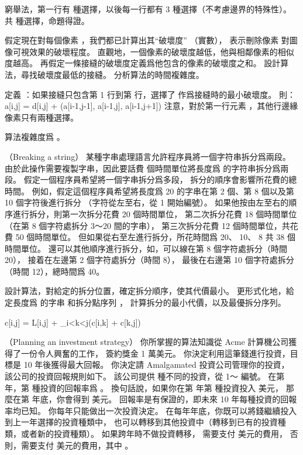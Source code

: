 \startANSWER
窮舉法，第一行有  種選擇，以後每一行都有 3 種選擇（不考慮邊界的特殊性）。
共  種選擇，命題得證。
\stopANSWER

\startigNum[continue]
\startitem
假定現在對每個像素 ，我們都已計算出其“破壞度”  （實數），
表示刪除像素  對圖像可視效果的破壞程度。
直觀地，一個像素的破壞度越低，他與相鄰像素的相似度越高。
再假定一條接縫的破壞度定義爲他包含的像素的破壞度之和。
設計算法，尋找破壞度最低的接縫。
分析算法的時間複雜度。
\stopitem
\stopigNum

\startANSWER
定義 ：如果接縫只包含第 1 行到第  行，選擇了  作爲接縫時的最小破壞度。
則：
\startformula
a[i,j] = d[i,j] + \min(a[i-1,j-1], a[i-1,j], a[i-1,j+1])
\stopformula
注意，對於第一行元素 ，其他行邊緣像素只有兩種選擇。

算法複雜度爲 。
\stopANSWER

\stopPROBLEM

\startPROBLEM
（Breaking a string）
某種字串處理語言允許程序員將一個字符串拆分爲兩段。
由於此操作需要複製字串，因此要話費  個時間單位將長度爲  的字符串拆分爲兩段。
假定一個程序員希望將一個字串拆分爲多段，
拆分的順序會影響所花費的總時間。
例如，假定這個程序員希望將長度爲 20 的字串在第 2 個、第 8 個以及第 10 個字符後進行拆分
（字符從左至右，從 1 開始編號）。
如果他按由左至右的順序進行拆分，則第一次拆分花費 20 個時間單位，
第二次拆分花費 18 個時間單位（在第 8 個字符處拆分 3～20 間的字串），
第三次拆分花費 12 個時間單位，共花費 50 個時間單位。
但如果從右至左進行拆分，所花時間爲 20、 10、 8 共 38 個時間單位。
還可以其他順序進行拆分，如，可以線在第 8 個字符處拆分（時間 20），
接着在左邊第 2 個字符處拆分（時間 8），
最後在右邊第 10 個字符處拆分（時間 12），總時間爲 40。

設計算法，對給定的拆分位置，確定拆分順序，使其代價最小。
更形式化地，給定長度爲  的字串  和拆分點序列 ，
計算拆分的最小代價，以及最優拆分序列。

\startANSWER
\startformula
c[i,j] = L[i,j] + \min_{i<k<j}(c[i,k] + c[k,j]) \qquad {}
\stopformula
\stopANSWER
\stopPROBLEM

\startPROBLEM
（Planning an investment strategy）
你所掌握的算法知識從 Acme 計算機公司獲得了一份令人興奮的工作，
簽約獎金 1 萬美元。
你決定利用這筆錢進行投資，目標是 10 年後獲得最大回報。
你決定請 Amalgamated 投資公司管理你的投資，
該公司的投資回報規則如下。
該公司提供  種不同的投資，從 1～ 編號。
在第  年，第  種投資的回報率爲 。
換句話說，如果你在第  年第  種投資投入  美元，
那麼在第  年底，你會得到  美元。
回報率是有保證的，即未來 10 年每種投資的回報率均已知。
你每年只能做出一次投資決定。
在每年年底，你既可以將錢繼續投入到上一年選擇的投資種類中，
也可以轉移到其他投資中（轉移到已有的投資種類，或者新的投資種類）。
如果跨年時不做投資轉移，
需要支付  美元的費用，
否則，需要支付  美元的費用，其中 。

